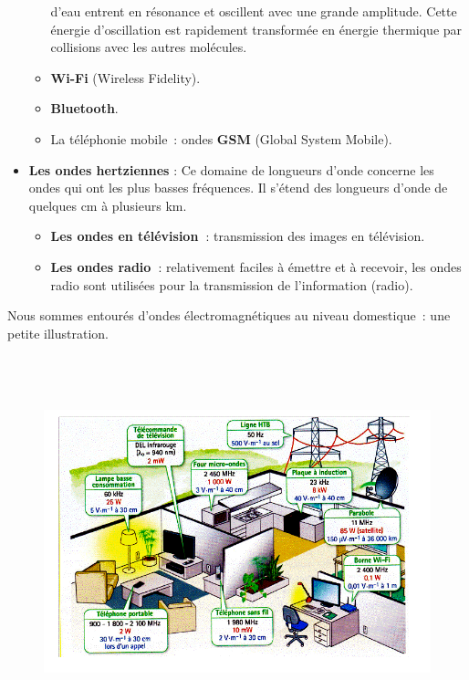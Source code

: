 \begin{itemize}
\begin{itemize}
    d'eau entrent en résonance et oscillent avec une grande amplitude.
    Cette énergie d'oscillation est rapidement transformée en énergie
    thermique par collisions avec les autres molécules.
  \item    \textbf{Wi-Fi} (Wireless Fidelity).
  \item    \textbf{Bluetooth}.
  \item
    La téléphonie mobile~: ondes \textbf{GSM} (Global System Mobile).
  \end{itemize}
\item \textbf{Les ondes hertziennes} : Ce domaine de
  longueurs d'onde concerne les ondes qui ont les plus basses
  fréquences. Il s'étend des longueurs d'onde de quelques cm à plusieurs
  km.
  \begin{itemize}
  \item    \textbf{Les ondes en télévision~}: transmission des images en
    télévision.
  \item    \textbf{Les ondes radio~}: relativement faciles à émettre et à
    recevoir, les ondes radio sont utilisées pour la transmission de
    l'information (radio).
  \end{itemize}
\end{itemize}

Nous sommes entourés d'ondes électromagnétiques au niveau domestique~: une petite illustration.

\begin{figure}
\centering
\includegraphics[width=15.847cm,height=10.767cm]{Pictures/10000001000002D5000001ED5EE60B9D153FD951.png}
\caption{}
\end{figure}
